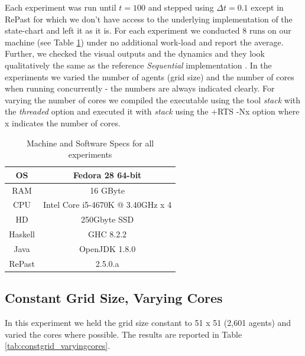 Each experiment was run until $t = 100$ and stepped using $\Delta t = 0.1$ except in RePast for which we don't have access to the underlying implementation of the state-chart and left it as it is. For each experiment we conducted 8 runs on our machine (see Table \ref{tab:machine_specs}) under no additional work-load and report the average. Further, we checked the visual outputs and the dynamics and they look qualitatively the same as the reference \textit{Sequential} implementation \cite{thaler_pure_2019}. In the experiments we varied the number of agents (grid size) and the number of cores when running concurrently - the numbers are always indicated clearly. For varying the number of cores we compiled the executable using the tool \textit{stack} with the \textit{threaded} option and executed it with \textit{stack} using the +RTS -Nx option where x indicates the number of cores. 

\begin{table}
	\centering
	\begin{tabular}{ c || c }
		OS & Fedora 28 64-bit \\ \hline
		RAM & 16 GByte \\ \hline
		CPU & Intel Core i5-4670K @ 3.40GHz x 4 \\ \hline
		HD & 250Gbyte SSD \\ \hline
		Haskell & GHC 8.2.2 \\ \hline
		Java & OpenJDK 1.8.0 \\ \hline
		RePast & 2.5.0.a
	\end{tabular}
	
	\caption{Machine and Software Specs for all experiments}
	\label{tab:machine_specs}
\end{table}

\subsection{Constant Grid Size, Varying Cores}
In this experiment we held the grid size constant to 51 x 51 (2,601 agents) and varied the cores where possible. The results are reported in Table \ref{tab:constgrid_varyingcores}.

